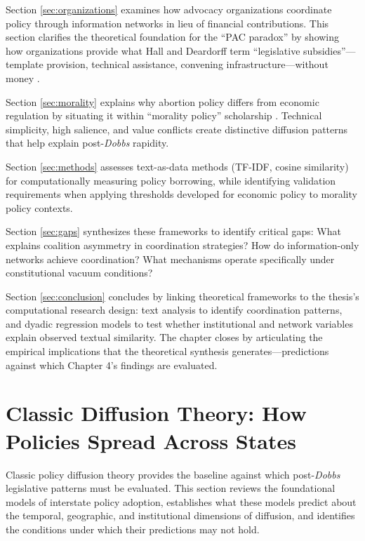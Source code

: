 Section \ref{sec:organizations} examines how advocacy organizations coordinate policy through information networks in lieu of financial contributions. This section clarifies the theoretical foundation for the ``PAC paradox'' by showing how organizations provide what Hall and Deardorff term ``legislative subsidies''---template provision, technical assistance, convening infrastructure---without money \parencite{hallBuyingTimeMoneyed}.

Section \ref{sec:morality} explains why abortion policy differs from economic regulation by situating it within ``morality policy'' scholarship \parencite{mooneyLegislativeMoralityAmerican1995,mooneyInfluenceValuesConsensus2000,mooneyDoesMoralityPolicy2008a,haider-markelPolicyDiffusionGeographical2001}. Technical simplicity, high salience, and value conflicts create distinctive diffusion patterns that help explain post-\textit{Dobbs} rapidity.

Section \ref{sec:methods} assesses text-as-data methods (TF-IDF, cosine similarity) for computationally measuring policy borrowing, while identifying validation requirements when applying thresholds developed for economic policy to morality policy contexts.

Section \ref{sec:gaps} synthesizes these frameworks to identify critical gaps: What explains coalition asymmetry in coordination strategies? How do information-only networks achieve coordination? What mechanisms operate specifically under constitutional vacuum conditions?

Section \ref{sec:conclusion} concludes by linking theoretical frameworks to the thesis's computational research design: text analysis to identify coordination patterns, and dyadic regression models to test whether institutional and network variables explain observed textual similarity. The chapter closes by articulating the empirical implications that the theoretical synthesis generates---predictions against which Chapter 4's findings are evaluated.


\section{Classic Diffusion Theory: How Policies Spread Across States}
\label{sec:classic}

Classic policy diffusion theory provides the baseline against which post-\emph{Dobbs} legislative patterns must be evaluated. This section reviews the foundational models of interstate policy adoption, establishes what these models predict about the temporal, geographic, and institutional dimensions of diffusion, and identifies the conditions under which their predictions may not hold.

